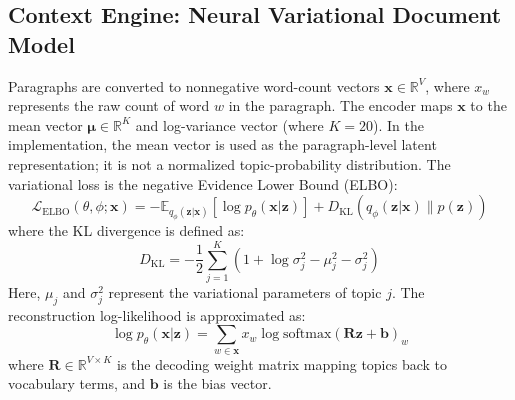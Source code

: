 \documentclass[pdflatex,sn-basic,Numbered]{sn-jnl}
\begin{document}
\subsection{Context Engine: Neural Variational Document Model}
Paragraphs are converted to nonnegative word-count vectors $\mathbf{x} \in \mathbb{R}^{V}$, where $x_w$ represents the raw count of word $w$ in the paragraph. The encoder maps $\mathbf{x}$ to the mean vector $\boldsymbol{\mu} \in \mathbb{R}^{K}$ and log-variance vector (where $K=20$). In the implementation, the mean vector is used as the paragraph-level latent representation; it is not a normalized topic-probability distribution. The variational loss is the negative Evidence Lower Bound (ELBO):
\begin{equation}
\mathcal{L}_{\text{ELBO}}(\theta, \phi; \mathbf{x}) = -\mathbb{E}_{q_\phi(\mathbf{z}|\mathbf{x})}[\log p_\theta(\mathbf{x}|\mathbf{z})] + D_{\text{KL}}(q_\phi(\mathbf{z}|\mathbf{x}) \parallel p(\mathbf{z}))
\end{equation}
where the KL divergence is defined as:
\begin{equation}
D_{\text{KL}} = -\frac{1}{2} \sum_{j=1}^{K} \left( 1 + \log \sigma_j^2 - \mu_j^2 - \sigma_j^2 \right)
\end{equation}
Here, $\mu_j$ and $\sigma_j^2$ represent the variational parameters of topic $j$. The reconstruction log-likelihood is approximated as:
\begin{equation}
\log p_\theta(\mathbf{x}|\mathbf{z}) = \sum_{w \in \mathbf{x}} x_w \log \text{softmax}(\mathbf{R}\mathbf{z} + \mathbf{b})_w
\end{equation}
where $\mathbf{R} \in \mathbb{R}^{V \times K}$ is the decoding weight matrix mapping topics back to vocabulary terms, and $\mathbf{b}$ is the bias vector.
\end{document}
